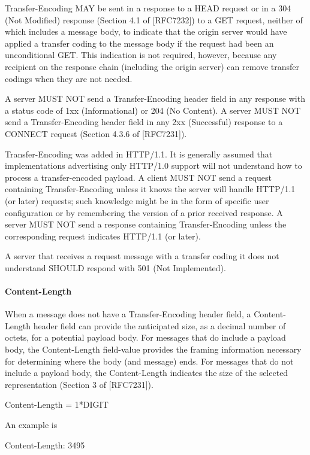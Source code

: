 Transfer-Encoding MAY be sent in a response to a HEAD request or in a
304 (Not Modified) response (Section 4.1 of [RFC7232]) to a GET
request, neither of which includes a message body, to indicate that
the origin server would have applied a transfer coding to the message
body if the request had been an unconditional GET.  This indication
is not required, however, because any recipient on the response chain
(including the origin server) can remove transfer codings when they
are not needed.

A server MUST NOT send a Transfer-Encoding header field in any
response with a status code of 1xx (Informational) or 204 (No
Content).  A server MUST NOT send a Transfer-Encoding header field in
any 2xx (Successful) response to a CONNECT request (Section 4.3.6 of
[RFC7231]).

Transfer-Encoding was added in HTTP/1.1.  It is generally assumed
that implementations advertising only HTTP/1.0 support will not
understand how to process a transfer-encoded payload.  A client MUST
NOT send a request containing Transfer-Encoding unless it knows the
server will handle HTTP/1.1 (or later) requests; such knowledge might
   be in the form of specific user configuration or by remembering the
   version of a prior received response.  A server MUST NOT send a
   response containing Transfer-Encoding unless the corresponding
   request indicates HTTP/1.1 (or later).

   A server that receives a request message with a transfer coding it
   does not understand SHOULD respond with 501 (Not Implemented).

\paragraph{Content-Length }
When a message does not have a Transfer-Encoding header field, a
   Content-Length header field can provide the anticipated size, as a
   decimal number of octets, for a potential payload body.  For messages
   that do include a payload body, the Content-Length field-value
   provides the framing information necessary for determining where the
   body (and message) ends.  For messages that do not include a payload
   body, the Content-Length indicates the size of the selected
   representation (Section 3 of [RFC7231]).

     Content-Length = 1*DIGIT

   An example is

     Content-Length: 3495

